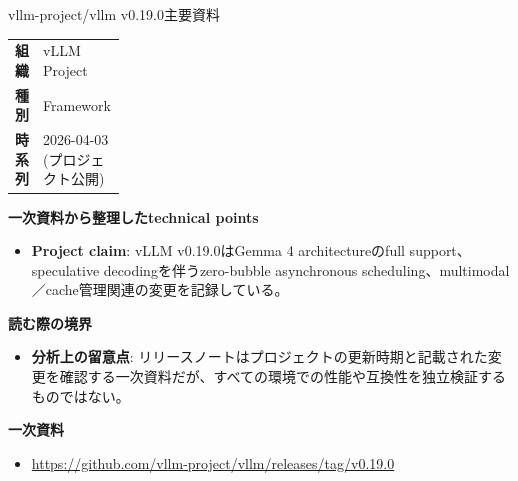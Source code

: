 \begin{technicalnote}{vllm-project/vllm v0.19.0}{主要資料}
\begingroup
\begin{tabularx}{\linewidth}{@{}>{\bfseries}p{0.22\linewidth}X@{}}
組織 & vLLM Project \\
種別 & Framework \\
時系列 & 2026-04-03 (プロジェクト公開) \\
\end{tabularx}
\smallskip
{\bfseries 一次資料から整理したtechnical points}
\begin{itemize}[leftmargin=1.5em,itemsep=0.35em]
\item \textbf{Project claim}: vLLM v0.19.0はGemma 4 architectureのfull support、speculative decodingを伴うzero-bubble asynchronous scheduling、multimodal／cache管理関連の変更を記録している。
\end{itemize}
{\bfseries 読む際の境界}
\begin{itemize}[leftmargin=1.5em,itemsep=0.35em]
\item \textbf{分析上の留意点}: リリースノートはプロジェクトの更新時期と記載された変更を確認する一次資料だが、すべての環境での性能や互換性を独立検証するものではない。
\end{itemize}
\begin{samepage}
{\bfseries 一次資料}
\begingroup\sloppy
\begin{itemize}[leftmargin=1.5em,itemsep=0.25em]
\item {\scriptsize\url{https://github.com/vllm-project/vllm/releases/tag/v0.19.0}}
\end{itemize}
\endgroup
\end{samepage}
\endgroup
\end{technicalnote}
\medskip

